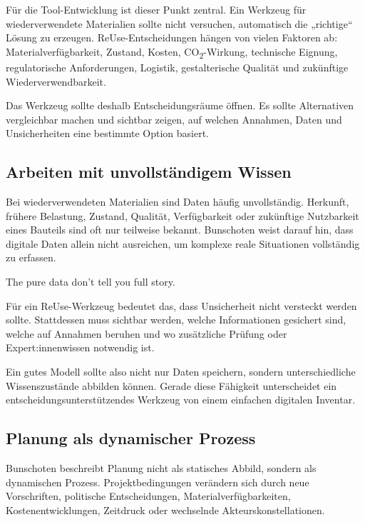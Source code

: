 Für die Tool-Entwicklung ist dieser Punkt zentral. Ein Werkzeug für wiederverwendete Materialien sollte nicht versuchen, automatisch die „richtige“ Lösung zu erzeugen. ReUse-Entscheidungen hängen von vielen Faktoren ab: Materialverfügbarkeit, Zustand, Kosten, CO\textsubscript{2}-Wirkung, technische Eignung, regulatorische Anforderungen, Logistik, gestalterische Qualität und zukünftige Wiederverwendbarkeit.

Das Werkzeug sollte deshalb Entscheidungsräume öffnen. Es sollte Alternativen vergleichbar machen und sichtbar zeigen, auf welchen Annahmen, Daten und Unsicherheiten eine bestimmte Option basiert.

\subsection{Arbeiten mit unvollständigem Wissen}

Bei wiederverwendeten Materialien sind Daten häufig unvollständig. Herkunft, frühere Belastung, Zustand, Qualität, Verfügbarkeit oder zukünftige Nutzbarkeit eines Bauteils sind oft nur teilweise bekannt. Bunschoten weist darauf hin, dass digitale Daten allein nicht ausreichen, um komplexe reale Situationen vollständig zu erfassen.

\begin{Blockquote}
The pure data don't tell you full story.
\end{Blockquote}

Für ein ReUse-Werkzeug bedeutet das, dass Unsicherheit nicht versteckt werden sollte. Stattdessen muss sichtbar werden, welche Informationen gesichert sind, welche auf Annahmen beruhen und wo zusätzliche Prüfung oder Expert:innenwissen notwendig ist.

Ein gutes Modell sollte also nicht nur Daten speichern, sondern unterschiedliche Wissenszustände abbilden können. Gerade diese Fähigkeit unterscheidet ein entscheidungsunterstützendes Werkzeug von einem einfachen digitalen Inventar.

\subsection{Planung als dynamischer Prozess}

Bunschoten beschreibt Planung nicht als statisches Abbild, sondern als dynamischen Prozess. Projektbedingungen verändern sich durch neue Vorschriften, politische Entscheidungen, Materialverfügbarkeiten, Kostenentwicklungen, Zeitdruck oder wechselnde Akteurskonstellationen.

